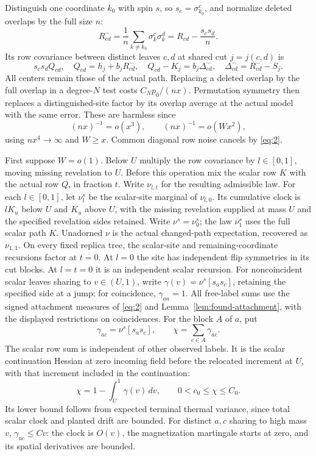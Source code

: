 Distinguish one coordinate \(k_0\) with spin \(s\), so
\(s_c=\sigma_{k_0}^c\), and normalize deleted overlaps by the full size
\(n\):
\[
 R^-_{cd}=\frac1n\sum_{k\ne k_0}\sigma_k^c\sigma_k^d
         =R_{cd}-\frac{s_cs_d}{n}.
\]
Its row covariance between distinct leaves \(c,d\) at shared cut
\(j=j(c,d)\) is
\[
 s_cs_dQ_{cd},\quad Q_{cd}=h_j+b_jR^-_{cd},\quad
 Q_{cd}-K_j=b_j\Delta^-_{cd},\quad
 \Delta^-_{cd}=R^-_{cd}-S_j.
\]
All centers remain those of the actual path. Replacing
a deleted overlap by the full overlap in a degree-\(N\)
test costs \(C_Np_0/(nx)\). Permutation symmetry then
replaces a distinguished-site factor by its overlap
average at the actual model with the same error.
These are harmless since
\[
                  (nx)^{-1}=o(x^3),\qquad (nx)^{-1}=o(Wx^2),
\]
using \(nx^4\to\infty\) and \(W\ge x\).
Common diagonal row noise cancels by \eqref{eq:2}.

First suppose \(W=o(1)\). Below \(U\) multiply the row
covariance by \(l\in[0,1]\), moving missing revelation
to \(U\). Before this operation mix the scalar row
\(K\) with the actual row \(Q\), in fraction \(t\).
Write \(\nu_{l,t}\) for the resulting admissible law.
For each \(l\in[0,1]\), let \(\nu_l^s\) be the scalar-site marginal
of \(\nu_{l,0}\). Its cumulative clock is \(lK_u\) below \(U\) and
\(K_u\) above \(U\), with the missing revelation supplied at mass
\(U\) and the specified revelation sides retained. Write
\(\nu^s=\nu_0^s\); the law \(\nu_1^s\) uses the full scalar path
\(K\). Unadorned \(\nu\) is the actual changed-path expectation,
recovered as \(\nu_{1,1}\). On every fixed replica tree, the scalar-site
and remaining-coordinate recursions factor at \(t=0\).
At \(l=0\) the site has independent flip symmetries
in its cut blocks. At \(l=t=0\) it is an independent
scalar recursion.
For noncoincident scalar leaves sharing to \(v\in(U,1)\), write
\(\gamma(v)=\nu^s[s_as_c]\), retaining the specified side at a jump;
for coincidence, \(\gamma_{aa}=1\). All free-label sums use the signed
attachment measures of \eqref{eq:2} and
Lemma~\ref{lem:found-attachment}, with the displayed restrictions on
coincidences. For the block \(A\) of \(a\), put
\[
             \gamma_{ac}=\nu^s[s_as_c],\qquad
             \chi=\sum_{c\in A}\gamma_{ac}.
\]
The scalar row sum is independent of other observed
labels. It is the scalar continuation Hessian at zero incoming field
before the relocated increment at \(U\), with that increment included
in the continuation:
\[
       \chi=1-\int_U^1\gamma(v)\,dv,\qquad 0<c_0\le\chi\le C_0.
\]
Its lower bound follows from expected terminal thermal
variance, since total scalar clock and planted drift
are bounded. For distinct \(a,c\) sharing to high mass
\(v\), \(\gamma_{ac}\le Cv\): the clock is \(O(v)\),
the magnetization martingale starts at zero, and its
spatial derivatives are bounded.

